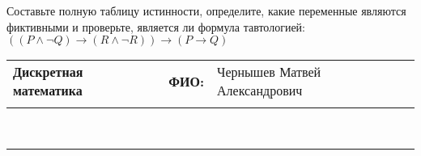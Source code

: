 \documentclass[10pt]{exam}
\newcommand{\class}{Дискретная математика}
\newcommand{\examdate}{}
\begin{document}
\begin{questions}
\begin{enumerate} [a)]
\end{enumerate}\question Составьте полную таблицу истинности, определите, какие переменные являются фиктивными и проверьте, является ли формула тавтологией:
$(( P \land \neg Q) \rightarrow (R \land \neg R)) \rightarrow (P \rightarrow Q)$

\end{questions}
\newpage
\begin{flushright}
\begin{tabular}{p{2.8in} r l}
\textbf{\class} & \textbf{ФИО:} &Чернышев Матвей Александрович
\\

\textbf{\examdate} &&\\
\end{tabular}\\
\end{flushright}
\rule[1ex]{\textwidth}{.1pt}
\end{document}
